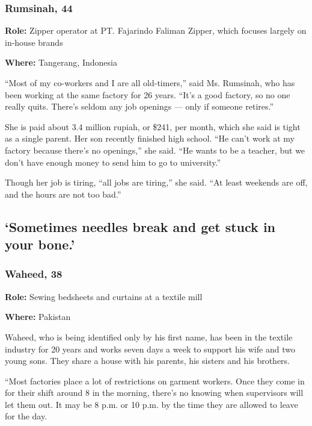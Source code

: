 \hypertarget{rumsinah-44-}{%
\subsubsection{Rumsinah, 44 }\label{rumsinah-44-}}

\textbf{Role:} Zipper operator at PT. Fajarindo Faliman Zipper, which
focuses largely on in-house brands

\textbf{Where:} Tangerang, Indonesia

``Most of my co-workers and I are all old-timers,'' said Ms. Rumsinah,
who has been working at the same factory for 26 years. ``It's a good
factory, so no one really quits. There's seldom any job openings ---
only if someone retires.''

She is paid about 3.4 million rupiah, or \$241, per month, which she
said is tight as a single parent. Her son recently finished high school.
``He can't work at my factory because there's no openings,'' she said.
``He wants to be a teacher, but we don't have enough money to send him
to go to university.''

Though her job is tiring, ``all jobs are tiring,'' she said. ``At least
weekends are off, and the hours are not too bad.''

\hypertarget{sometimes-needles-break-and-get-stuck-in-your-bone}{%
\subsection{`Sometimes needles break and get stuck in your
bone.'}\label{sometimes-needles-break-and-get-stuck-in-your-bone}}

\hypertarget{waheed-38}{%
\subsubsection{Waheed, 38}\label{waheed-38}}

\textbf{Role:} Sewing bedsheets and curtains at a textile mill

\textbf{Where:} Pakistan

Waheed, who is being identified only by his first name, has been in the
textile industry for 20 years and works seven days a week to support his
wife and two young sons. They share a house with his parents, his
sisters and his brothers.

``Most factories place a lot of restrictions on garment workers. Once
they come in for their shift around 8 in the morning, there's no knowing
when supervisors will let them out. It may be 8 p.m. or 10 p.m. by the
time they are allowed to leave for the day.

